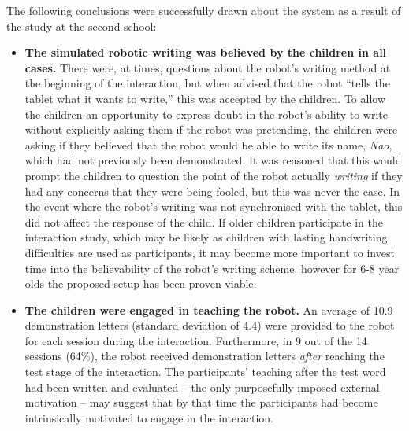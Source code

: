 \documentclass{sig-alternate}
\begin{document}
The following conclusions were successfully drawn about the system as a result
of the study at the second school:

\begin{itemize}%
%
%

    \item \textbf{The simulated robotic writing was believed by the children in all
    cases.} There were, at times, 
    questions about the robot's writing method at the beginning of the interaction,
    but when advised that the robot ``tells the tablet what it wants to write,''
    this was accepted by the children. To allow the children an opportunity to
    express doubt in the robot's ability to write without explicitly asking them if
    the robot was pretending, the children were asking if they believed that the
    robot would be able to write its name, \emph{Nao}, which had not previously been
    demonstrated. It was reasoned that this would prompt the children to question
    the point of the robot actually \emph{writing} if they had any concerns that
    they were being fooled, but this was never the case. In the event where the
    robot's writing was not synchronised with the tablet, this did not affect the
    response of the child. If older children participate in the interaction study,
    which may be likely as children with lasting handwriting difficulties are used
    as participants, it may become more important to invest time into the
    believability of the robot's writing scheme. however for 6-8 year olds the
    proposed setup has been proven viable.

    \item \textbf{The children were engaged in teaching the robot.} %
    An average of 10.9 demonstration letters (standard deviation of 4.4) were
    provided to the robot for each session during the interaction. Furthermore,
    in 9 out of the 14 sessions (64\%), the robot received demonstration letters
    \emph{after} reaching the test stage of the interaction. The participants'
    teaching after the test word had been written and evaluated -- the only
    purposefully imposed external motivation -- may suggest that by that time
    the participants had become intrinsically motivated to engage in the
    interaction.%


\end{itemize}
\end{document}
